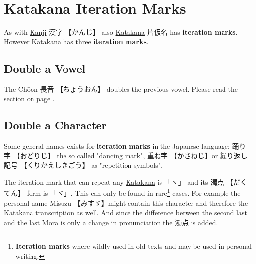 \section{Katakana Iteration Marks}
\label{sec:Iteration}
\label{sec:KatakanaIterationMarks}
\label{sec:Choon}
\label{sec:RepitionMark}
\label{sec:RepitionMarkForKanjiAndKana}
\label{sec:Kunojiten}

As with \hyperref[sec:Kanji]{Kanji} {漢字} {【かんじ】} also
\hyperref[sec:Katakana]{Katakana} {片仮名} has \textbf{iteration marks}.
However \hyperref[sec:Katakana]{Katakana} has three \textbf{iteration marks}. 

\subsection{Double a Vowel}\label{subsec:Choon}


The Chōon {長音} {【ちょうおん】} doubles the previous vowel. Please read the
section  on page \pageref{subsec:DoublingVowel}.

\subsection{Double a Character}

Some general names exists for \textbf{iteration marks} in the Japanese
language: {踊り字} {【おどりじ】} the so called  "dancing mark", {重ね字}
{【かさねじ】}or  {繰り返し記号} {【くりかえしきごう】} as "repetition symbols".


The iteration mark that can repeat any \hyperref[sec:Katakana]{Katakana} is
{「ヽ」}  and its {濁点} {【だくてん】} form is {「ヾ」}. This can only be
found in rare\footnote{\textbf{Iteration marks} where wildly used in old texts
and may be used in personal writing.} cases. For example the personal name
Misuzu 【みすゞ】might contain this character and therefore the Katakana
transcription as well. And since the difference between the second last and
the last \hyperref[sec:Mora]{Mora} is only a change in pronunciation the {濁点}
is added.

